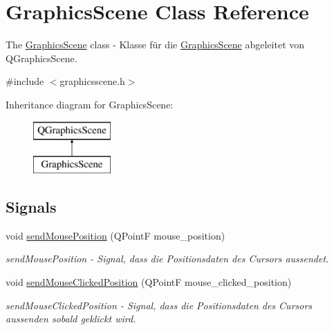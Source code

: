 \hypertarget{class_graphics_scene}{}\section{Graphics\+Scene Class Reference}
\label{class_graphics_scene}


The \hyperlink{class_graphics_scene}{Graphics\+Scene} class -\/ Klasse für die \hyperlink{class_graphics_scene}{Graphics\+Scene} abgeleitet von Q\+Graphics\+Scene.  




{\ttfamily \#include $<$graphicsscene.\+h$>$}

Inheritance diagram for Graphics\+Scene\+:\begin{figure}[H]
\begin{center}
\leavevmode
\includegraphics[height=2.000000cm]{class_graphics_scene}
\end{center}
\end{figure}
\subsection*{Signals}
\begin{DoxyCompactItemize}
\item 
void \hyperlink{class_graphics_scene_aee2d967bd98adf009edf0ecd08cec189}{send\+Mouse\+Position} (Q\+PointF mouse\+\_\+position)
\begin{DoxyCompactList}\small\item\em send\+Mouse\+Position -\/ Signal, dass die Positionsdaten des Cursors aussendet. \end{DoxyCompactList}\item 
void \hyperlink{class_graphics_scene_ac781d598feae85b0a0c6a90c30f914bd}{send\+Mouse\+Clicked\+Position} (Q\+PointF mouse\+\_\+clicked\+\_\+position)
\begin{DoxyCompactList}\small\item\em send\+Mouse\+Clicked\+Position -\/ Signal, dass die Positionsdaten des Cursors aussenden sobald geklickt wird. \end{DoxyCompactList}\end{DoxyCompactItemize}
